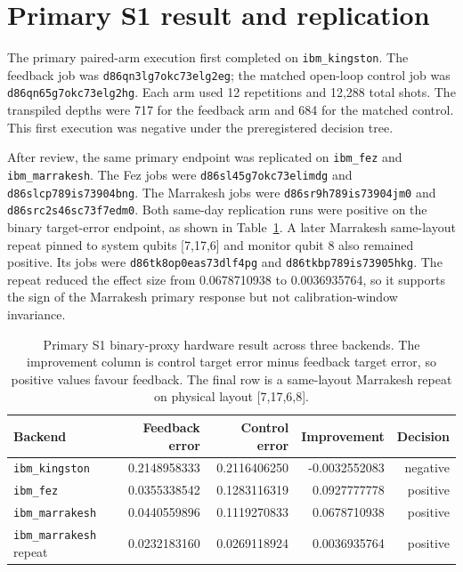 \documentclass[preprint,aps,physrev,superscriptaddress,floatfix,longbibliography]{revtex4-2}
\begin{document}
\section{Primary S1 result and replication}

The primary paired-arm execution first completed on \texttt{ibm\_kingston}.
The feedback job was \texttt{d86qn3lg7okc73elg2eg}; the matched open-loop
control job was \texttt{d86qn65g7okc73elg2hg}. Each arm used 12 repetitions
and 12,288 total shots. The transpiled depths were 717 for the feedback arm
and 684 for the matched control. This first execution was negative under the
preregistered decision tree.

After review, the same primary endpoint was replicated on \texttt{ibm\_fez}
and \texttt{ibm\_marrakesh}. The Fez jobs were
\texttt{d86sl45g7okc73elimdg} and \texttt{d86slcp789is73904bng}. The
Marrakesh jobs were \texttt{d86sr9h789is73904jm0} and
\texttt{d86src2s46sc73f7edm0}. Both same-day replication runs were positive
on the binary target-error endpoint, as shown in Table~\ref{tab:s1-primary}.
A later Marrakesh same-layout repeat pinned to system qubits [7,17,6] and
monitor qubit 8 also remained positive. Its jobs were
\texttt{d86tk8op0eas73dlf4pg} and \texttt{d86tkbp789is73905hkg}. The repeat
reduced the effect size from 0.0678710938 to 0.0036935764, so it supports the
sign of the Marrakesh primary response but not calibration-window invariance.

\begin{table}[tb]
\centering
\small
\begin{tabular}{lrrrr}
\toprule
Backend & Feedback error & Control error & Improvement & Decision \\
\midrule
\texttt{ibm\_kingston} & 0.2148958333 & 0.2116406250 & -0.0032552083 & negative \\
\texttt{ibm\_fez} & 0.0355338542 & 0.1283116319 & 0.0927777778 & positive \\
\texttt{ibm\_marrakesh} & 0.0440559896 & 0.1119270833 & 0.0678710938 & positive \\
\texttt{ibm\_marrakesh} repeat & 0.0232183160 & 0.0269118924 & 0.0036935764 & positive \\
\bottomrule
\end{tabular}
\caption{Primary S1 binary-proxy hardware result across three backends. The
improvement column is control target error minus feedback target error, so
positive values favour feedback. The final row is a same-layout Marrakesh
repeat on physical layout [7,17,6,8].}
\label{tab:s1-primary}
\end{table}
\end{document}
